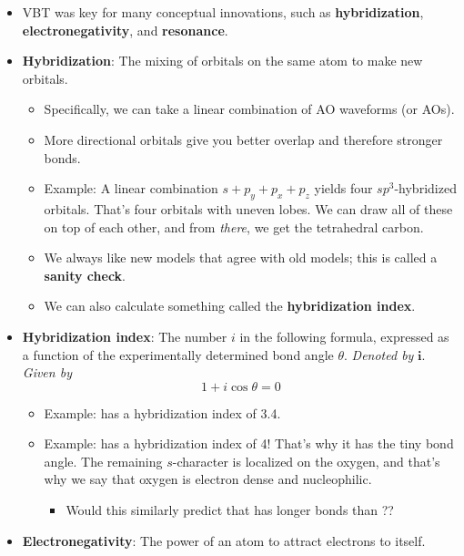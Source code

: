 \documentclass[../notes.tex]{subfiles}
\begin{document}
\begin{itemize}
\begin{itemize}
    \end{itemize}
    \item VBT was key for many conceptual innovations, such as \textbf{hybridization}, \textbf{electronegativity}, and \textbf{resonance}.
    \item \textbf{Hybridization}: The mixing of orbitals on the same atom to make new orbitals.
    \begin{itemize}
        \item Specifically, we can take a linear combination of AO waveforms (or AOs).
        \item More directional orbitals give you better overlap and therefore stronger bonds.
        \item Example: A linear combination $s+p_y+p_x+p_z$ yields four $sp^3$-hybridized orbitals. That's four orbitals with uneven lobes. We can draw all of these on top of each other, and from \emph{there}, we get the tetrahedral carbon.
        \item We always like new models that agree with old models; this is called a \textbf{sanity check}.
        \item We can also calculate something called the \textbf{hybridization index}.
    \end{itemize}
    \item \textbf{Hybridization index}: The number $i$ in the following formula, expressed as a function of the experimentally determined bond angle $\theta$. \emph{Denoted by} $\bm{i}$. \emph{Given by}
    \begin{equation*}
        1+i\cos\theta = 0
    \end{equation*}
    \begin{itemize}
        \item Example:  has a hybridization index of 3.4.
        \item Example:  has a hybridization index of 4! That's why it has the tiny bond angle. The remaining $s$-character is localized on the oxygen, and that's why we say that oxygen is electron dense and nucleophilic.
        \begin{itemize}
            \item Would this similarly predict that  has longer bonds than ??
        \end{itemize}
    \end{itemize}
    \item \textbf{Electronegativity}: The power of an atom to attract electrons to itself.
    \begin{itemize}

\end{itemize}
\end{itemize}
\end{document}
